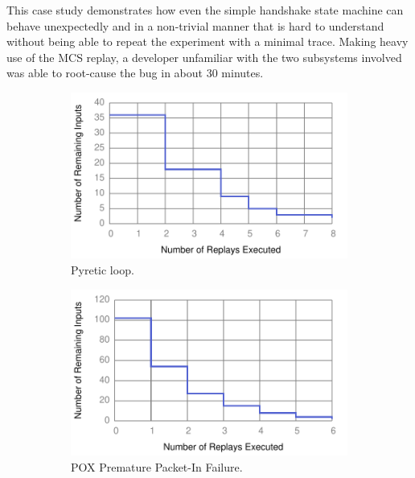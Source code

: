 This case study demonstrates how even the simple handshake state machine can
behave unexpectedly and in a non-trivial manner that is hard to understand
without being able to repeat the experiment with a minimal trace. Making heavy
use of the MCS replay, a developer unfamiliar with the two subsystems involved
was able to root-cause the bug in about 30 minutes.
\begin{figure}[!htb]
\begin{subfigure}{0.32\textwidth}
    \includegraphics[width=\textwidth]{../graphs/runtime/pyretic_loop.pdf}
    \caption[]{\label{fig:pyretic_loop} Pyretic loop.}
\end{subfigure}\hfill
\begin{subfigure}{0.32\textwidth}
    \includegraphics[width=\textwidth]{../graphs/runtime/pox_early_packetin.pdf}
    \caption[]{\label{fig:pox_handshake} POX Premature Packet-In Failure.}
\end{subfigure}\hfill
\begin{subfigure}{0.32\textwidth}

\end{subfigure}
\end{figure}
